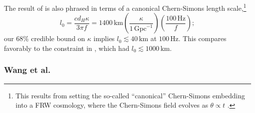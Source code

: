 \documentclass[aps,prd,twocolumn,superscriptaddress,preprintnumbers,nofootinbib]{revtex4-2}
\begin{document}
The result of \citet{Okounkova_2022} is also phrased in terms of a canonical Chern-Simons length scale,\footnote{This results from setting the so-called ``canonical'' Chern-Simons embedding into a FRW cosmology, where the Chern-Simons field evolves as $\theta \propto t$ \cite{Alexander:2009tp,Jackiw:2003pm,Yunes2009}.} 
\begin{equation}
    l_0 = \frac{c d_H \kappa}{3 \pi f} = 1400 \, \mathrm{km} \left( \frac{\kappa}{1 \, \mathrm{Gpc}^{-1}} \right) \left( \frac{100 \, \mathrm{Hz}}{f} \right);
\end{equation}
our 68\% credible bound on $\kappa$ implies $l_0 \lesssim 40 \, \mathrm{km}$ at $100 \, \mathrm{Hz}$.  This compares favorably to the constraint in \citet{Okounkova_2022}, which had $l_0 \lesssim 1000 \, \mathrm{km}$.


\subsubsection{Wang et al.}
\end{document}
